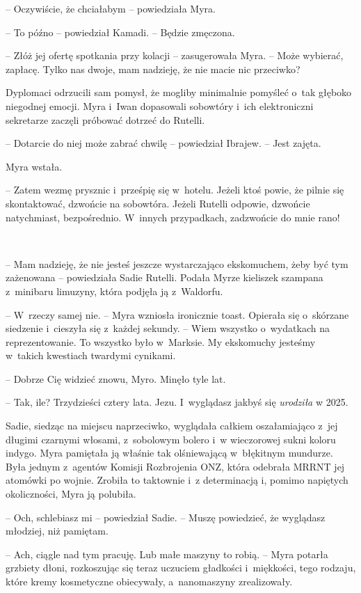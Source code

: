 \documentclass[oneside,polish,11pt,sfheadings]{mwbk}
\begin{document}
-- Oczywiście, że chciałabym -- powiedziała Myra.

-- To późno -- powiedział Kamadi. -- Będzie zmęczona.

-- Złóż jej ofertę spotkania przy kolacji -- zasugerowała Myra. -- Może
wybierać, zapłacę. Tylko nas dwoje, mam nadzieję, że nie macie nic
przeciwko?

Dyplomaci odrzucili sam pomysł, że mogliby minimalnie pomyśleć o~tak
głęboko niegodnej emocji. Myra i~Iwan dopasowali sobowtóry i~ich
elektroniczni sekretarze zaczęli próbować dotrzeć do Rutelli.

-- Dotarcie do niej może zabrać chwilę -- powiedział Ibrajew. -- Jest
zajęta.

Myra wstała. 

-- Zatem wezmę prysznic i~prześpię się w~hotelu. Jeżeli ktoś
powie, że pilnie się skontaktować, dzwońcie na sobowtóra. Jeżeli Rutelli
odpowie, dzwońcie natychmiast, bezpośrednio. W~innych przypadkach,
zadzwońcie do mnie rano!

~

-- Mam nadzieję, że nie jesteś jeszcze wystarczająco ekskomuchem, żeby
być tym zażenowana -- powiedziała Sadie Rutelli. Podała Myrze kieliszek
szampana z~minibaru limuzyny, która podjęła ją z~Waldorfu.

-- W~rzeczy samej nie. -- Myra wzniosła ironicznie toast. Opierała się o~skórzane siedzenie i~cieszyła się z~każdej sekundy. -- Wiem wszystko o~wydatkach na reprezentowanie. To wszystko było w~Marksie. My ekskomuchy
jesteśmy w~takich kwestiach twardymi cynikami.

-- Dobrze Cię widzieć znowu, Myro. Minęło tyle lat.

-- Tak, ile? Trzydzieści cztery lata. Jezu. I~wyglądasz jakbyś się
\textit{urodziła }w 2025.

Sadie, siedząc na miejscu naprzeciwko, wyglądała całkiem oszałamiająco z~jej długimi czarnymi włosami, z~sobolowym bolero i~w wieczorowej sukni
koloru indygo. Myra pamiętała ją właśnie tak olśniewającą w~błękitnym
mundurze. Była jednym z~agentów Komisji Rozbrojenia ONZ, która odebrała
MRRNT jej atomówki po wojnie. Zrobiła to taktownie i~z determinacją i,
pomimo napiętych okoliczności, Myra ją polubiła.

-- Och, schlebiasz mi -- powiedział Sadie. -- Muszę powiedzieć, że
wyglądasz młodziej, niż pamiętam.

-- Ach, ciągle nad tym pracuję. Lub małe maszyny to robią. -- Myra potarła
grzbiety dłoni, rozkoszując się teraz uczuciem gładkości i~miękkości,
tego rodzaju, które kremy kosmetyczne obiecywały, a~nanomaszyny
zrealizowały.
\end{document}
